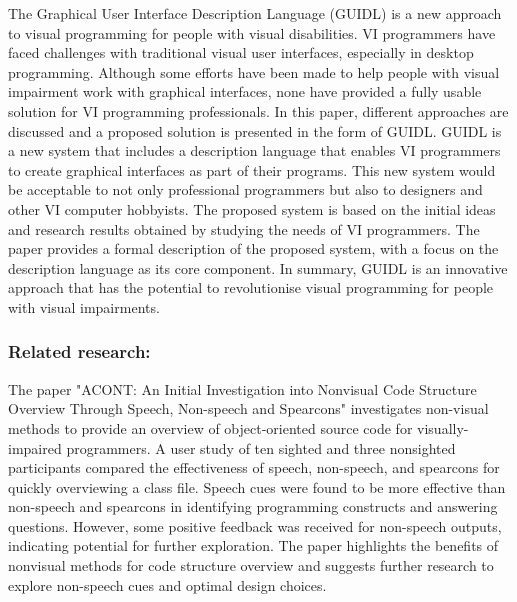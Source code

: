 \documentclass{l4proj}
\begin{document}
The Graphical User Interface Description Language (GUIDL) \cite{GUIDL_2012} is a new approach to visual programming for people with visual disabilities. VI programmers have faced challenges with traditional visual user interfaces, especially in desktop programming. Although some efforts have been made to help people with visual impairment work with graphical interfaces, none have provided a fully usable solution for VI programming professionals. In this paper, different approaches are discussed and a proposed solution is presented in the form of GUIDL. GUIDL is a new system that includes a description language that enables VI programmers to create graphical interfaces as part of their programs. This new system would be acceptable to not only professional programmers but also to designers and other VI computer hobbyists. The proposed system is based on the initial ideas and research results obtained by studying the needs of VI programmers. The paper provides a formal description of the proposed system, with a focus on the description language as its core component. In summary, GUIDL is an innovative approach that has the potential to revolutionise visual programming for people with visual impairments.

\subsubsection{Related research:}

The paper "ACONT: An Initial Investigation into Nonvisual Code Structure Overview Through Speech, Non-speech and Spearcons" \cite{ACONT_2018} investigates non-visual methods to provide an overview of object-oriented source code for visually-impaired programmers. A user study of ten sighted and three nonsighted participants compared the effectiveness of speech, non-speech, and spearcons for quickly overviewing a class file. Speech cues were found to be more effective than non-speech and spearcons in identifying programming constructs and answering questions. However, some positive feedback was received for non-speech outputs, indicating potential for further exploration. The paper highlights the benefits of nonvisual methods for code structure overview and suggests further research to explore non-speech cues and optimal design choices.
\end{document}

